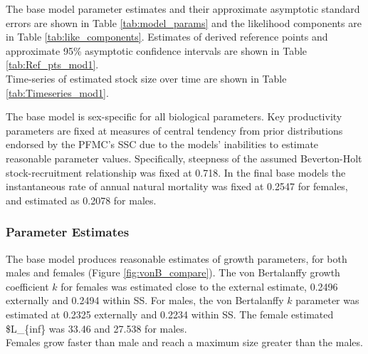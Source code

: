 \documentclass[12pt,]{article}
\begin{document}
The base model parameter estimates and their approximate asymptotic
standard errors are shown in Table \ref{tab:model_params} and the
likelihood components are in Table \ref{tab:like_components}. Estimates
of derived reference points and approximate 95\% asymptotic confidence
intervals are shown in Table \ref{tab:Ref_pts_mod1}.\\
Time-series of estimated stock size over time are shown in Table
\ref{tab:Timeseries_mod1}.

The base model is sex-specific for all biological parameters. Key
productivity parameters are fixed at measures of central tendency from
prior distributions endorsed by the PFMC's SSC due to the models'
inabilities to estimate reasonable parameter values. Specifically,
steepness of the assumed Beverton-Holt stock-recruitment relationship
was fixed at 0.718. In the final base models the instantaneous rate of
annual natural mortality was fixed at 0.2547 for females, and estimated
as 0.2078 for males.

\subsubsection{Parameter Estimates}\label{parameter-estimates}

The base model produces reasonable estimates of growth parameters, for
both males and females (Figure \ref{fig:vonB_compare}). The von
Bertalanffy growth coefficient \(k\) for females was estimated close to
the external estimate, 0.2496 externally and 0.2494 within SS. For
males, the von Bertalanffy \(k\) parameter was estimated at 0.2325
externally and 0.2234 within SS. The female estimated \$L\_\{inf\} was
33.46 and 27.538 for males.\\
Females grow faster than male and reach a maximum size greater than the
males.
\end{document}
